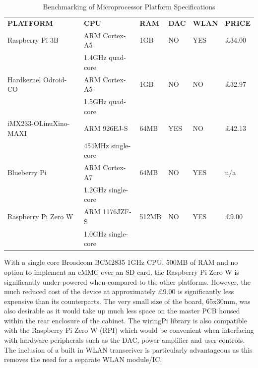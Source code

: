 \documentclass[main.tex]{subfiles}
\begin{document}
\begin{table}[H]
    \centering  
    \caption{Benchmarking of Microprocessor Platform Specifications}
    \begin{tabu} to 0.8\textwidth { | l | l | l | l | l | l | }
        \hline
        \textbf{PLATFORM} &  \textbf{CPU} & \textbf{RAM} & \textbf{DAC} & \textbf{WLAN} & \textbf{PRICE}  \\
        \hhline{|=|=|=|=|=|=|}
        Raspberry Pi 3B\cite{rpiB} & ARM Cortex-A5 & 1GB & NO & YES & £34.00 \\
        & 1.4GHz quad-core & & & & \\
        \hline
        Hardkernel Odroid-CO\cite{odroid} & ARM Cortex-A5 & 1GB & NO & NO & £32.97 \\
        & 1.5GHz quad-core & & & & \\
        \hline
        iMX233-OLinuXino-MAXI\cite{olimex} & ARM 926EJ-S & 64MB & YES & NO & £42.13 \\
        & 454MHz single-core & & & & \\
        \hline
        Blueberry Pi\cite{blueberrypi} & ARM Cortex-A7 & 64MB & NO & YES & n/a \\
        & 1.2GHz single-core & & & & \\
        \hline
        Raspberry Pi Zero W\cite{rpi} & ARM 1176JZF-S & 512MB & NO & YES & £9.00 \\
        & 1.0GHz single-core & & & & \\
        \hline
        
        
    \end{tabu}
    
    \label{table:HWPlatforms}
    \end{table}

\medskip

\medskip
With a single core Broadcom BCM2835 1GHz CPU, 500MB of RAM and no option to implement an eMMC over an SD card, the Raspberry Pi Zero W is significantly under-powered when compared to the other platforms. 
However, the much reduced cost of the device at approximately £9.00\cite{RpiPrice} is significantly less expensive than its counterparts. The very small size of the board, 65x30mm, was also desirable as it would take up much less space on the master PCB housed within the rear enclosure of the cabinet. 
The wiringPi library is also compatible with the Raspberry Pi Zero W (RPI) which would be convenient when interfacing with hardware peripherals such as the DAC, power-amplifier and user controls. The inclusion of a built in WLAN transceiver is particularly advantageous as this removes the need for a separate WLAN module/IC. 
\end{document}
